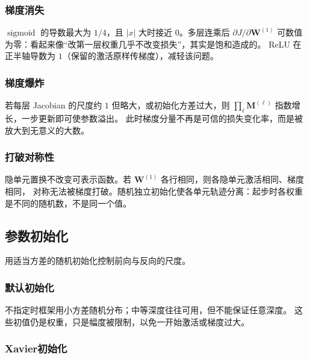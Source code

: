 \subsubsection{梯度消失}

$\operatorname{sigmoid}$ 的导数最大为 $1/4$，且 $|x|$ 大时接近 $0$。多层连乘后
$\partial J/\partial\bm{W}^{(1)}$ 可数值为零：看起来像“改第一层权重几乎不改变损失”，其实是饱和造成的。
ReLU 在正半轴导数为 $1$（保留的激活原样传梯度），减轻该问题。

\subsubsection{梯度爆炸}

若每层 Jacobian 的尺度约 $1$ 但略大，或初始化方差过大，则
$\prod_{\ell}\bm{M}^{(\ell)}$ 指数增长，一步更新即可使参数溢出。
此时梯度分量不再是可信的损失变化率，而是被放大到无意义的大数。

\subsubsection{打破对称性}

隐单元置换不改变可表示函数。若 $\bm{W}^{(1)}$ 各行相同，则各隐单元激活相同、梯度相同，
对称无法被梯度打破。随机独立初始化使各单元轨迹分离：起步时各权重是不同的随机数，不是同一个值。

\subsection{参数初始化}

用适当方差的随机初始化控制前向与反向的尺度。

\subsubsection{默认初始化}

不指定时框架用小方差随机分布；中等深度往往可用，但不能保证任意深度。
这些初值仍是权重，只是幅度被限制，以免一开始激活或梯度过大。

\subsubsection{Xavier初始化}

